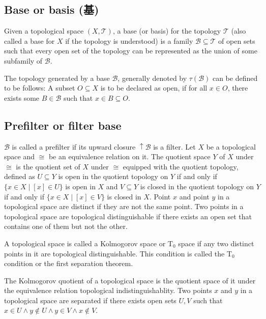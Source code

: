 \documentclass[a4paper,12pt]{article}
\begin{document}
\subsection{Base or basis (基)}
Given a topological space $(X,\mathcal{T})$, a base (or basis) for the topology $\mathcal{T}$ (also called a base for $X$ if the topology is understood) is a family $\mathcal{B}\subseteq\mathcal{T}$ of open sets such that every open set of the topology can be represented as the union of some subfamily of $\mathcal{B}$.

The topology generated by a base $\mathcal{B}$, generally denoted by $\tau(\mathcal{B})$ can be defined to be follows: A subset $O\subseteq X$ is to be declared as open, if for all $x\in O$, there exists some $B\in\mathcal{B}$ such that $x\in B\subseteq O$.
\subsection{Prefilter or filter base}
$\mathcal{B}$ is called a prefilter if its upward closure $\uparrow\mathcal{B}$ is a filter.
Let $X$ be a topological space and $\cong$ be an equivalence relation on it. The quotient space $Y$ of $X$ under $\cong$ is the quotient set of $X$ under $\cong$ equipped with the quotient topology, defined as $U\subseteq Y$ is open in the quotient topology on $Y$ if and only if $\{x\in X\mid[x]\in U\}$ is open in $X$ and $V\subseteq Y$ is closed in the quotient topology on $Y$ if and only if $\{x\in X\mid[x]\in V\}$ is closed in $X$.
Point $x$ and point $y$ in a topological space are distinct if they are not the same point.
Two points in a topological space are topological distinguishable if there exists an open set that contains one of them but not the other.

A topological space is called a Kolmogorov space or T$_0$ space if any two distinct points in it are topological distinguishable. This condition is called the T$_0$ condition or the first separation theorem.

The Kolmogorov quotient of a topological space is the quotient space of it under the equivalence relation topological indistinguishablity.
Two points $x$ and $y$ in a topological space are separated if there exists open sets $U,V$ such that $x\in U\land y\notin U\land y\in V\land x\notin V$.
\end{document}

